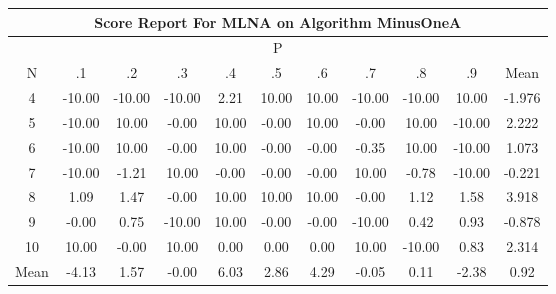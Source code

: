 \documentclass[11pt,a4paper]{report}
\begin{document}
\begin{longtable}{ | c || c | c | c | c | c | c | c | c | c || c |}
\hline
\multicolumn{11}{|c|}{ Score Report For MLNA on Algorithm MinusOneA} \\
\hline
\multicolumn{11}{|c|}{ P } \\
\hline
N & .1 & .2 & .3 & .4 & .5 & .6 & .7 & .8 & .9 & Mean\\
 \hline
 \hline
 \endhead
  4 &  \cellcolor[HTML]{FF0000} -10.00 &  \cellcolor[HTML]{FF0000} -10.00 &  \cellcolor[HTML]{FF0000} -10.00 &  \cellcolor[HTML]{C7C7FF} 2.21 &  \cellcolor[HTML]{0808FF} 10.00 &  \cellcolor[HTML]{0808FF} 10.00 &  \cellcolor[HTML]{FF0000} -10.00 &  \cellcolor[HTML]{FF0000} -10.00 &  \cellcolor[HTML]{0808FF} 10.00 & -1.976 \\
  5 &  \cellcolor[HTML]{FF0000} -10.00 &  \cellcolor[HTML]{0808FF} 10.00 &  \cellcolor[HTML]{FFFFFF} -0.00 &  \cellcolor[HTML]{0808FF} 10.00 &  \cellcolor[HTML]{FFFFFF} -0.00 &  \cellcolor[HTML]{0808FF} 10.00 &  \cellcolor[HTML]{FFFFFF} -0.00 &  \cellcolor[HTML]{0808FF} 10.00 &  \cellcolor[HTML]{FF0000} -10.00 & 2.222 \\
  6 &  \cellcolor[HTML]{FF0000} -10.00 &  \cellcolor[HTML]{0808FF} 10.00 &  \cellcolor[HTML]{FFFFFF} -0.00 &  \cellcolor[HTML]{0808FF} 10.00 &  \cellcolor[HTML]{FFFFFF} -0.00 &  \cellcolor[HTML]{FFFFFF} -0.00 &  \cellcolor[HTML]{FFF7F7} -0.35 &  \cellcolor[HTML]{0808FF} 10.00 &  \cellcolor[HTML]{FF0000} -10.00 & 1.073 \\
  7 &  \cellcolor[HTML]{FF0000} -10.00 &  \cellcolor[HTML]{FFDFDF} -1.21 &  \cellcolor[HTML]{0808FF} 10.00 &  \cellcolor[HTML]{FFFFFF} -0.00 &  \cellcolor[HTML]{FFFFFF} -0.00 &  \cellcolor[HTML]{FFFFFF} -0.00 &  \cellcolor[HTML]{0808FF} 10.00 &  \cellcolor[HTML]{FFEFEF} -0.78 &  \cellcolor[HTML]{FF0000} -10.00 & -0.221 \\
  8 &  \cellcolor[HTML]{E7E7FF} 1.09 &  \cellcolor[HTML]{D7D7FF} 1.47 &  \cellcolor[HTML]{FFFFFF} -0.00 &  \cellcolor[HTML]{0808FF} 10.00 &  \cellcolor[HTML]{0808FF} 10.00 &  \cellcolor[HTML]{0808FF} 10.00 &  \cellcolor[HTML]{FFFFFF} -0.00 &  \cellcolor[HTML]{DFDFFF} 1.12 &  \cellcolor[HTML]{D7D7FF} 1.58 & 3.918 \\
  9 &  \cellcolor[HTML]{FFFFFF} -0.00 &  \cellcolor[HTML]{EFEFFF} 0.75 &  \cellcolor[HTML]{FF0000} -10.00 &  \cellcolor[HTML]{0808FF} 10.00 &  \cellcolor[HTML]{FFFFFF} -0.00 &  \cellcolor[HTML]{FFFFFF} -0.00 &  \cellcolor[HTML]{FF0000} -10.00 &  \cellcolor[HTML]{F7F7FF} 0.42 &  \cellcolor[HTML]{E7E7FF} 0.93 & -0.878 \\
  10 &  \cellcolor[HTML]{0808FF} 10.00 &  \cellcolor[HTML]{FFFFFF} -0.00 &  \cellcolor[HTML]{0808FF} 10.00 &  \cellcolor[HTML]{FFFFFF} 0.00 &  \cellcolor[HTML]{FFFFFF} 0.00 &  \cellcolor[HTML]{FFFFFF} 0.00 &  \cellcolor[HTML]{0808FF} 10.00 &  \cellcolor[HTML]{FF0000} -10.00 &  \cellcolor[HTML]{E7E7FF} 0.83 & 2.314 \\
 \hline
 \hline
Mean &  \cellcolor[HTML]{FF9797} -4.13 &  \cellcolor[HTML]{D7D7FF} 1.57 &  \cellcolor[HTML]{FFFFFF} -0.00 &  \cellcolor[HTML]{6868FF} 6.03 &  \cellcolor[HTML]{B7B7FF} 2.86 &  \cellcolor[HTML]{9797FF} 4.29 &  \cellcolor[HTML]{FFFFFF} -0.05 &  \cellcolor[HTML]{FFFFFF} 0.11 &  \cellcolor[HTML]{FFC7C7} -2.38 &  \cellcolor[HTML]{E7E7FF} 0.92
\end{longtable}
\end{document}
